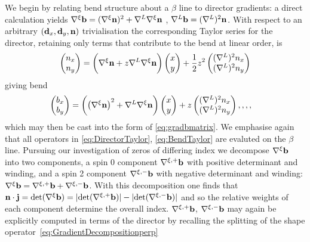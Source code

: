 {We begin by relating bend structure about a $\beta$ line to director gradients: a direct calculation yields $\nabla^\xi \mathbf{b} = (\nabla^\xi{\bf n})^2+\nabla^L \nabla^\xi{\bf n}$ , $\nabla^L \mathbf{b} = (\nabla^L)^2 \mathbf{n}$. With respect to an arbitrary $(\mathbf{d}_x,\mathbf{d}_y, \mathbf{n})$ trivialisation the corresponding Taylor series for the director, retaining only terms that contribute to the bend at linear order, is
\begin{align}
\begin{pmatrix} n_x \\ n_y \end{pmatrix} & = \biggl( \nabla^\xi {\bf n}  + z  \nabla^L\nabla^\xi {\bf n} \biggr) \begin{pmatrix} x \\ y \end{pmatrix} + \frac{1}{2} z^2 \begin{pmatrix} (\nabla^L)^2 n_x \\ (\nabla^L)^2 n_y \end{pmatrix} \\
\label{eq:DirectorTaylor}
\end{align}
giving bend
\begin{align}
\begin{pmatrix}b_x \\ b_y\end{pmatrix} & =
\biggl(\left(\nabla^\xi {\bf n}\right)^2+ \nabla^L\nabla^\xi {\bf n} \biggr) \begin{pmatrix} x \\ y \end{pmatrix}
 + z \begin{pmatrix}(\nabla^L)^2 n_x \\ (\nabla^L)^2 n_y \end{pmatrix},,,,
\label{eq:BendTaylor}
\end{align}
which may then be cast into the form of \eqref{eq:gradbmatrix}. We emphasise again that all operators in \eqref{eq:DirectorTaylor}, \eqref{eq:BendTaylor} are evaluted on the $\beta$ line. Pursuing our investigation of zeros of differing index we decompose $\nabla^\xi \mathbf{b}$ into two components, a spin 0 component $\nabla^{\xi, +} \mathbf{b}$ with positive determinant and winding, and a spin 2 component $\nabla^{\xi, -} \mathbf{b}$ with negative determinant and winding: $\nabla^\xi \mathbf{b} = \nabla^{\xi,+} \mathbf{b} + \nabla^{\xi,-} \mathbf{b}$. With this decomposition one finds that $\mathbf{n} \cdot \mathbf{j} = \mathrm{det}(\nabla^\xi \mathbf{b}) = |\mathrm{det}(\nabla^{\xi, +} \mathbf{b})| - |\mathrm{det}(\nabla^{\xi, -} \mathbf{b})| $ and so the relative weights of each component determine the overall index. $\nabla^{\xi,+} \mathbf{b}$, $\nabla^{\xi,-} \mathbf{b}$ may again be explicitly computed in terms of the director by recalling the splitting of the shape operator~\eqref{eq:GradientDecompositionperp}
}
